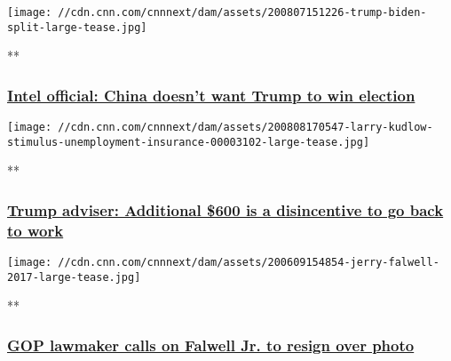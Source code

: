 \href{/videos/politics/2020/08/07/2020-election-russia-china-iran-perez-sot-nr-vpx.cnn/video/playlists/this-week-in-politics/}{}

\texttt{[image: //cdn.cnn.com/cnnnext/dam/assets/200807151226-trump-biden-split-large-tease.jpg]}

**

\hypertarget{intel-official-china-doesnt-want-trump-to-win-election}{%
\subsubsection{\texorpdfstring{\href{/videos/politics/2020/08/07/2020-election-russia-china-iran-perez-sot-nr-vpx.cnn/video/playlists/this-week-in-politics/}{Intel
official: China doesn't want Trump to win
election}}{Intel official: China doesn't want Trump to win election}}\label{intel-official-china-doesnt-want-trump-to-win-election}}

\href{/videos/business/2020/08/07/larry-kudlow-stimulus-unemployment-insurance.cnnbusiness/video/playlists/this-week-in-politics/}{}

\texttt{[image: //cdn.cnn.com/cnnnext/dam/assets/200808170547-larry-kudlow-stimulus-unemployment-insurance-00003102-large-tease.jpg]}

**

\hypertarget{trump-adviser-additional-600-is-a-disincentive-to-go-back-to-work}{%
\subsubsection{\texorpdfstring{\href{/videos/business/2020/08/07/larry-kudlow-stimulus-unemployment-insurance.cnnbusiness/video/playlists/this-week-in-politics/}{Trump
adviser: Additional \$600 is a disincentive to go back to
work}}{Trump adviser: Additional \$600 is a disincentive to go back to work}}\label{trump-adviser-additional-600-is-a-disincentive-to-go-back-to-work}}

\href{/videos/us/2020/08/07/jerry-falwell-jr-photo-liberty-university-vpx.cnn/video/playlists/this-week-in-politics/}{}

\texttt{[image: //cdn.cnn.com/cnnnext/dam/assets/200609154854-jerry-falwell-2017-large-tease.jpg]}

**

\hypertarget{gop-lawmaker-calls-on-falwell-jr-to-resign-over-photo}{%
\subsubsection{\texorpdfstring{\href{/videos/us/2020/08/07/jerry-falwell-jr-photo-liberty-university-vpx.cnn/video/playlists/this-week-in-politics/}{GOP
lawmaker calls on Falwell Jr. to resign over
photo}}{GOP lawmaker calls on Falwell Jr. to resign over photo}}\label{gop-lawmaker-calls-on-falwell-jr-to-resign-over-photo}}

